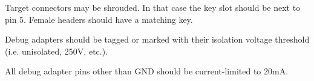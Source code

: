 Target connectors may be shrouded. In that case the key slot should be next to
pin 5. Female headers should have a matching key.

Debug adapters should be tagged or marked with their isolation voltage
threshold (i.e. unisolated, 250V, etc.).

All debug adapter pins other than GND should be current-limited to 20mA.
